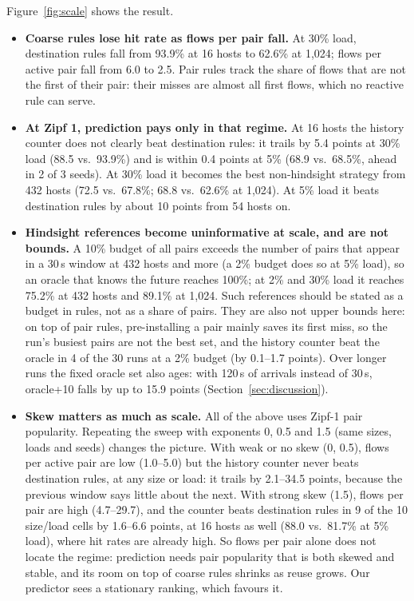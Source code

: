\documentclass[conference]{IEEEtran}
\begin{document}
Figure~\ref{fig:scale} shows the result.
\begin{itemize}
\item \textbf{Coarse rules lose hit rate as flows per pair fall.} At 30\% load, destination rules fall from 93.9\% at 16 hosts to 62.6\% at 1,024; flows per active pair fall from 6.0 to 2.5. Pair rules track the share of flows that are not the first of their pair: their misses are almost all first flows, which no reactive rule can serve.
\item \textbf{At Zipf 1, prediction pays only in that regime.} At 16 hosts the history counter does not clearly beat destination rules: it trails by 5.4 points at 30\% load (88.5 vs.\ 93.9\%) and is within 0.4 points at 5\% (68.9 vs.\ 68.5\%, ahead in 2 of 3 seeds). At 30\% load it becomes the best non-hindsight strategy from 432 hosts (72.5 vs.\ 67.8\%; 68.8 vs.\ 62.6\% at 1,024). At 5\% load it beats destination rules by about 10 points from 54 hosts on.
\item \textbf{Hindsight references become uninformative at scale, and are not bounds.} A 10\% budget of all pairs exceeds the number of pairs that appear in a 30\,s window at 432 hosts and more (a 2\% budget does so at 5\% load), so an oracle that knows the future reaches 100\%; at 2\% and 30\% load it reaches 75.2\% at 432 hosts and 89.1\% at 1,024. Such references should be stated as a budget in rules, not as a share of pairs. They are also not upper bounds here: on top of pair rules, pre-installing a pair mainly saves its first miss, so the run's busiest pairs are not the best set, and the history counter beat the oracle in 4 of the 30 runs at a 2\% budget (by 0.1--1.7 points). Over longer runs the fixed oracle set also ages: with 120\,s of arrivals instead of 30\,s, oracle+10 falls by up to 15.9 points (Section~\ref{sec:discussion}).
\item \textbf{Skew matters as much as scale.} All of the above uses Zipf-1 pair popularity. Repeating the sweep with exponents 0, 0.5 and 1.5 (same sizes, loads and seeds) changes the picture. With weak or no skew (0, 0.5), flows per active pair are low (1.0--5.0) but the history counter never beats destination rules, at any size or load: it trails by 2.1--34.5 points, because the previous window says little about the next. With strong skew (1.5), flows per pair are high (4.7--29.7), and the counter beats destination rules in 9 of the 10 size/load cells by 1.6--6.6 points, at 16 hosts as well (88.0 vs.\ 81.7\% at 5\% load), where hit rates are already high. So flows per pair alone does not locate the regime: prediction needs pair popularity that is both skewed and stable, and its room on top of coarse rules shrinks as reuse grows. Our predictor sees a stationary ranking, which favours it.
\end{itemize}
\end{document}
